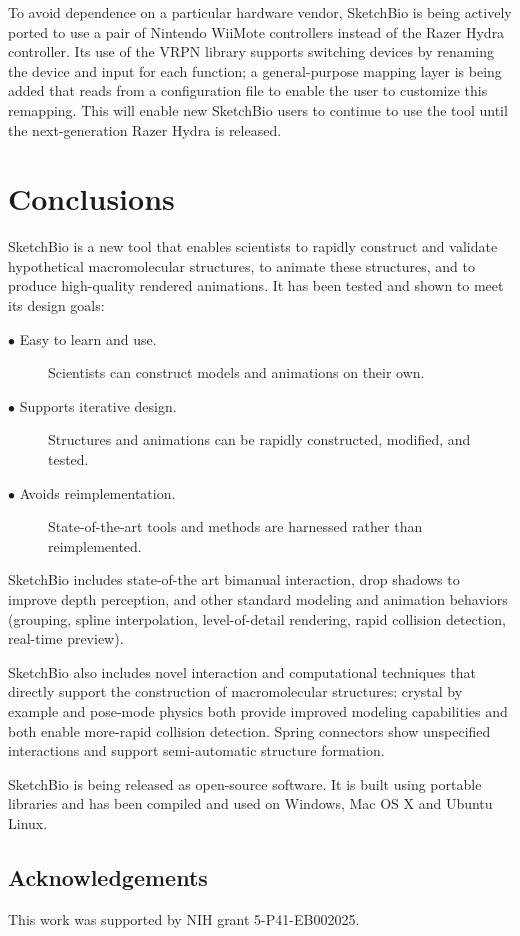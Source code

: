 \documentclass[twocolumn]{bmcart}%
\begin{document}
To avoid dependence on a particular hardware vendor, SketchBio is being actively ported to use a pair of Nintendo WiiMote controllers instead of the Razer Hydra controller.  Its use of the VRPN library supports switching devices by renaming the device and input for each function; a general-purpose mapping layer is being added that reads from a configuration file to enable the user to customize this remapping.  This will enable new SketchBio users to continue to use the tool until the next-generation Razer Hydra is released.

\section*{Conclusions}
SketchBio is a new tool that enables scientists to rapidly construct and validate hypothetical macromolecular structures, to animate these structures, and to produce high-quality rendered animations.  It has been tested and shown to meet its design goals:
\begin{description}
  \item[$\bullet$ Easy to learn and use.] Scientists can construct models and animations on their own.
  \item[$\bullet$ Supports iterative design.] Structures and animations can be rapidly constructed, modified, and tested.
  \item[$\bullet$ Avoids reimplementation.] State-of-the-art tools and methods are harnessed rather than reimplemented.
\end{description}

SketchBio includes state-of-the art bimanual interaction, drop shadows to improve depth perception, and other standard modeling and animation behaviors (grouping, spline interpolation, level-of-detail rendering, rapid collision detection, real-time preview).

SketchBio also includes novel interaction and computational techniques that directly support the construction of macromolecular structures: crystal by example and pose-mode physics both provide improved modeling capabilities and both enable more-rapid collision detection.  Spring connectors show unspecified interactions and support semi-automatic structure formation.

SketchBio is being released as open-source software.  It is built using portable libraries and has been compiled and used on Windows, Mac OS X and Ubuntu Linux.

\subsection*{Acknowledgements}
This work was supported by NIH grant 5-P41-EB002025.
\end{document}
